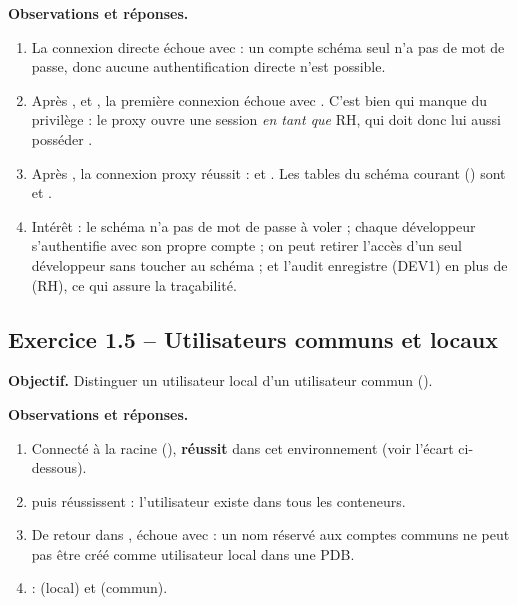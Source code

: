 \textbf{Observations et réponses.}
\begin{enumerate}
  \item La connexion directe  échoue avec  : un compte schéma seul n'a pas de mot de passe, donc aucune
        authentification directe n'est possible.
  \item Après ,  et
        , la première connexion
         échoue avec . C'est bien \textbf{} qui manque du privilège : le proxy ouvre
        une session \emph{en tant que} RH, qui doit donc lui aussi posséder .
  \item Après , la connexion proxy réussit :  et
        . Les tables du schéma courant
        () sont  et .
  \item Intérêt : le schéma  n'a pas de mot de passe à voler ; chaque développeur s'authentifie
        avec son propre compte ; on peut retirer l'accès d'un seul développeur sans toucher au schéma ; et
        l'audit enregistre  (DEV1) en plus de  (RH), ce qui assure la
        traçabilité.
\end{enumerate}

\subsection{Exercice 1.5 -- Utilisateurs communs et locaux}
\textbf{Objectif.} Distinguer un utilisateur local d'un utilisateur commun ().


\textbf{Observations et réponses.}
\begin{enumerate}
  \item Connecté à la racine (),  \textbf{réussit} dans cet environnement (voir l'écart ci-dessous).
  \item {} puis  réussissent : l'utilisateur existe dans tous les conteneurs.
  \item De retour dans ,  échoue avec  : un nom réservé aux comptes communs ne peut pas être créé comme
        utilisateur local dans une PDB.
  \item {} :  (local) et 
        (commun).
\end{enumerate}

